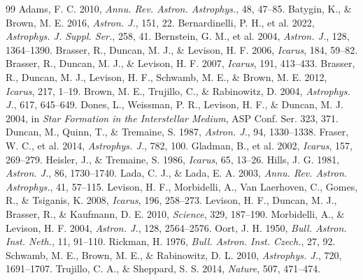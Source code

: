 \documentclass[11pt,a4paper]{article}
\begin{document}
\begin{thebibliography}{99}
 Adams, F. C. 2010, \textit{Annu. Rev. Astron. Astrophys.}, 48, 47--85.
 Batygin, K., \& Brown, M. E. 2016, \textit{Astron. J.}, 151, 22.
 Bernardinelli, P. H., et al. 2022, \textit{Astrophys. J. Suppl. Ser.}, 258, 41.
 Bernstein, G. M., et al. 2004, \textit{Astron. J.}, 128, 1364--1390.
 Brasser, R., Duncan, M. J., \& Levison, H. F. 2006, \textit{Icarus}, 184, 59--82.
 Brasser, R., Duncan, M. J., \& Levison, H. F. 2007, \textit{Icarus}, 191, 413--433.
 Brasser, R., Duncan, M. J., Levison, H. F., Schwamb, M. E., \& Brown, M. E. 2012, \textit{Icarus}, 217, 1--19.
 Brown, M. E., Trujillo, C., \& Rabinowitz, D. 2004, \textit{Astrophys. J.}, 617, 645--649.
 Dones, L., Weissman, P. R., Levison, H. F., \& Duncan, M. J. 2004, in \textit{Star Formation in the Interstellar Medium}, ASP Conf. Ser. 323, 371.
 Duncan, M., Quinn, T., \& Tremaine, S. 1987, \textit{Astron. J.}, 94, 1330--1338.
 Fraser, W. C., et al. 2014, \textit{Astrophys. J.}, 782, 100.
 Gladman, B., et al. 2002, \textit{Icarus}, 157, 269--279.
 Heisler, J., \& Tremaine, S. 1986, \textit{Icarus}, 65, 13--26.
 Hills, J. G. 1981, \textit{Astron. J.}, 86, 1730--1740.
 Lada, C. J., \& Lada, E. A. 2003, \textit{Annu. Rev. Astron. Astrophys.}, 41, 57--115.
 Levison, H. F., Morbidelli, A., Van Laerhoven, C., Gomes, R., \& Tsiganis, K. 2008, \textit{Icarus}, 196, 258--273.
 Levison, H. F., Duncan, M. J., Brasser, R., \& Kaufmann, D. E. 2010, \textit{Science}, 329, 187--190.
 Morbidelli, A., \& Levison, H. F. 2004, \textit{Astron. J.}, 128, 2564--2576.
 Oort, J. H. 1950, \textit{Bull. Astron. Inst. Neth.}, 11, 91--110.
 Rickman, H. 1976, \textit{Bull. Astron. Inst. Czech.}, 27, 92.
 Schwamb, M. E., Brown, M. E., \& Rabinowitz, D. L. 2010, \textit{Astrophys. J.}, 720, 1691--1707.
 Trujillo, C. A., \& Sheppard, S. S. 2014, \textit{Nature}, 507, 471--474.
\end{thebibliography}
\end{document}
